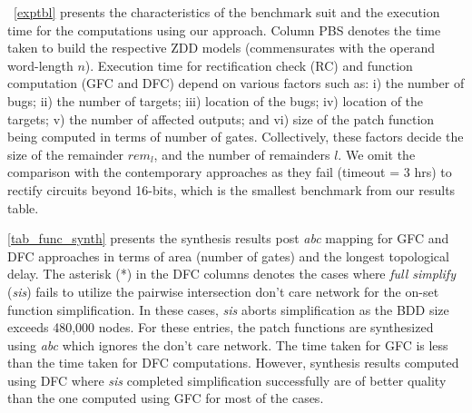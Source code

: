 ~\autoref{exptbl} presents the characteristics of the benchmark 
suit and the execution time for the computations using our approach.
Column PBS denotes the time taken to build the respective ZDD 
models (commensurates with the operand word-length $n$).
Execution time for rectification check (RC) and function computation (GFC and DFC) 
depend on various factors such as: i) the number of bugs; ii) the number of targets;
iii) location of the bugs; iv) location of the targets; v) the number of affected outputs;
and vi) size of the patch function being computed in terms of number of gates. 
Collectively, these factors decide the size of the remainder $rem_l$, and the
number of remainders $l$. 
We omit the comparison with the contemporary approaches as they
fail (timeout = 3 hrs) to rectify circuits beyond 16-bits,
which is the smallest benchmark from our results table. 

\autoref{tab_func_synth} presents the synthesis results post {\it abc} mapping 
for GFC and DFC approaches in terms of area (number of gates)
and the longest topological delay. The asterisk (*) in the DFC columns denotes the 
cases where {\it full simplify} ({\it sis}) fails to utilize the 
pairwise intersection don't care network for the on-set function simplification.
 In these cases, {\it sis} aborts simplification as the
 BDD size exceeds 480,000 nodes. For these entries, the patch functions
 are synthesized using {\it abc} which ignores the don't care network.
The time taken for GFC is less than the time taken for DFC computations.
However, synthesis results computed using DFC where {\it sis} completed
simplification successfully are of better quality than
the one computed using GFC for most of the cases.  


